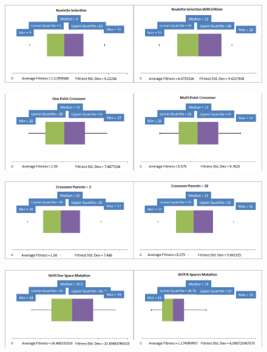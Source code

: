 \documentclass[]{report}
\begin{document}
\begin{figure}
	\centering
	\includegraphics[width=\textwidth]{figures/boxplots/selectionOperator.png}
	\label{BPselectionOperator}
\end{figure}

\begin{figure}
	\centering
	\includegraphics[width=\textwidth]{figures/boxplots/crossoverOperator.png}
	\label{BPcrossoverOperator}
\end{figure}

\begin{figure}
	\centering
	\includegraphics[width=\textwidth]{figures/boxplots/crossoverParentCount.png}
	\label{BPcrossoverParentCount}
\end{figure}

\begin{figure}
	\centering
	\includegraphics[width=\textwidth]{figures/boxplots/mutationOperator.png}
	\label{BPmutationOperator}
\end{figure}
\end{document}
